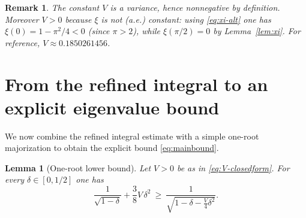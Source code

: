 \documentclass[11pt]{article}
\newtheorem{lemma}[theorem]{Lemma}
\newtheorem{remark}[theorem]{Remark}
\begin{document}
\begin{remark}\label{rem:V-positive}
The constant $V$ is a variance, hence nonnegative by definition.
Moreover $V>0$ because $\xi$ is not (a.e.) constant: using \eqref{eq:xi-alt} one has
\(\xi(0)=1-\pi^2/4<0\) (since $\pi>2$), while $\xi(\pi/2)=0$ by Lemma~\ref{lem:xi}.
For reference, $V\approx 0.1850261456$.
\end{remark}

\section{From the refined integral to an explicit eigenvalue bound}

We now combine the refined integral estimate with a simple one-root majorization to obtain the explicit bound \eqref{eq:mainbound}.

\begin{lemma}[One-root lower bound]
\label{lem:one-root}
Let $V>0$ be as in \eqref{eq:V-closedform}.
For every $\delta\in[0,1/2]$ one has
\begin{equation}
\label{eq:one-root}
\frac{1}{\sqrt{1-\delta}}+\frac{3}{8}V\,\delta^2
\ \ge\
\frac{1}{\sqrt{1-\delta-\frac{V}{4}\delta^2}}.
\end{equation}
\end{lemma}
\end{document}
